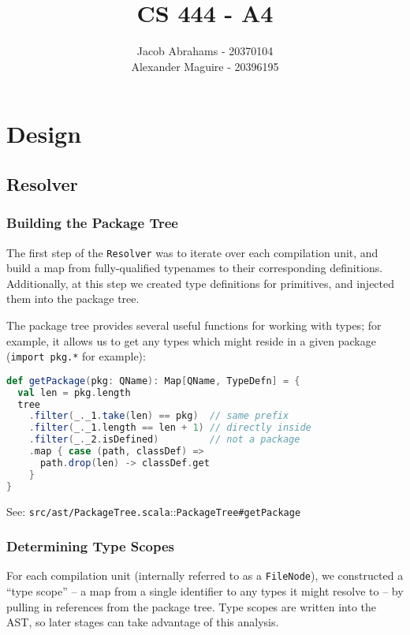 \documentclass{article}
\title{CS 444 - A4}
\author{Jacob Abrahams - 20370104\\ Alexander Maguire - 20396195}
\begin{document}
\newcommand\type[1]{\texttt{#1}}
\newcommand\func[1]{\texttt{#1}}
\newcommand\code[1]{\texttt{#1}}
\renewcommand\value[1]{\texttt{#1}}
\newcommand\source[2]{See: \texttt{src/#1.scala}::\type{#2} \\}
\newcommand\testsrc[1]{See: \texttt{test/#1.scala} \\}

\maketitle


\section{Design}

\subsection{Resolver}
\subsubsection{Building the Package Tree}
The first step of the \type{Resolver} was to iterate over each compilation unit, and build a map from fully-qualified
typenames to their corresponding definitions. Additionally, at this step we created type definitions for primitives, and
injected them into the package tree.

The package tree provides several useful functions for working with types; for example, it allows us to get any types
which might reside in a given package (\code{import pkg.*} for example):
\begin{lstlisting}[language=Scala]
def getPackage(pkg: QName): Map[QName, TypeDefn] = {
  val len = pkg.length
  tree
    .filter(_._1.take(len) == pkg)  // same prefix
    .filter(_._1.length == len + 1) // directly inside
    .filter(_._2.isDefined)         // not a package
    .map { case (path, classDef) =>
      path.drop(len) -> classDef.get
    }
}
\end{lstlisting}
\source{ast/PackageTree}{PackageTree\#getPackage}

\subsubsection{Determining Type Scopes}
For each compilation unit (internally referred to as a \type{FileNode}), we constructed a ``type scope'' -- a map from a
single identifier to any types it might resolve to -- by pulling in references from the package tree. Type scopes are
written into the AST, so later stages can take advantage of this analysis.
\end{document}
